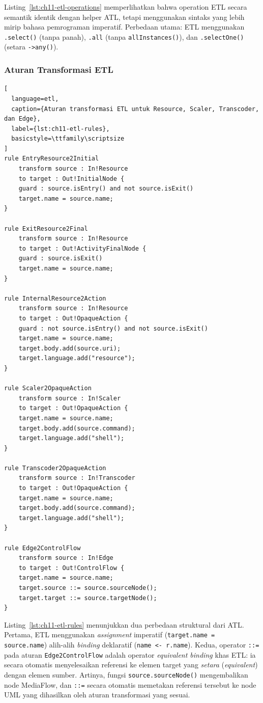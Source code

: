 \noindent Listing~\ref{lst:ch11-etl-operations} memperlihatkan bahwa operation ETL secara semantik identik dengan helper ATL, tetapi menggunakan sintaks yang lebih mirip bahasa pemrograman imperatif. Perbedaan utama: ETL menggunakan \texttt{.select()} (tanpa panah), \texttt{.all} (tanpa \texttt{allInstances()}), dan \texttt{.selectOne()} (setara \texttt{->any()}).

\subsubsection{Aturan Transformasi ETL}

\begin{lstlisting}[
  language=etl,
  caption={Aturan transformasi ETL untuk Resource, Scaler, Transcoder, dan Edge},
  label={lst:ch11-etl-rules},
  basicstyle=\ttfamily\scriptsize
]
rule EntryResource2Initial
    transform source : In!Resource
    to target : Out!InitialNode {
    guard : source.isEntry() and not source.isExit()
    target.name = source.name;
}

rule ExitResource2Final
    transform source : In!Resource
    to target : Out!ActivityFinalNode {
    guard : source.isExit()
    target.name = source.name;
}

rule InternalResource2Action
    transform source : In!Resource
    to target : Out!OpaqueAction {
    guard : not source.isEntry() and not source.isExit()
    target.name = source.name;
    target.body.add(source.uri);
    target.language.add("resource");
}

rule Scaler2OpaqueAction
    transform source : In!Scaler
    to target : Out!OpaqueAction {
    target.name = source.name;
    target.body.add(source.command);
    target.language.add("shell");
}

rule Transcoder2OpaqueAction
    transform source : In!Transcoder
    to target : Out!OpaqueAction {
    target.name = source.name;
    target.body.add(source.command);
    target.language.add("shell");
}

rule Edge2ControlFlow
    transform source : In!Edge
    to target : Out!ControlFlow {
    target.name = source.name;
    target.source ::= source.sourceNode();
    target.target ::= source.targetNode();
}
\end{lstlisting}

\noindent Listing~\ref{lst:ch11-etl-rules} menunjukkan dua perbedaan struktural dari ATL. Pertama, ETL menggunakan \textit{assignment} imperatif (\texttt{target.name = source.name}) alih-alih \textit{binding} deklaratif (\texttt{name <- r.name}). Kedua, operator \texttt{::=} pada aturan \texttt{Edge2ControlFlow} adalah operator \textit{equivalent binding} khas ETL: ia secara otomatis menyelesaikan referensi ke elemen target yang \textit{setara} (\textit{equivalent}) dengan elemen sumber. Artinya, fungsi \texttt{source.sourceNode()} mengembalikan node MediaFlow, dan \texttt{::=} secara otomatis memetakan referensi tersebut ke node UML yang dihasilkan oleh aturan transformasi yang sesuai.

